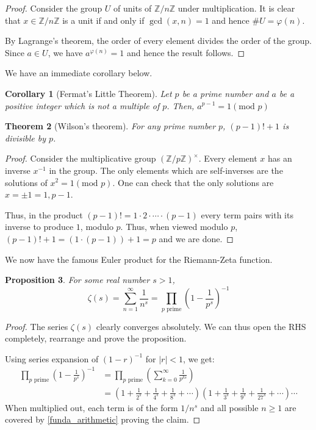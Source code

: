 \documentclass[10pt,openany]{book}
\newtheorem{theorem}{Theorem}[chapter]
\newtheorem{proposition}[theorem]{Proposition}
\theoremstyle{italicnonumber}
\newtheorem{corollary}[theorem]{Corollary}
\theoremstyle{definition}
\newcommand{\Z}{\mathbb{Z}}
\begin{document}
\begin{proof}
  Consider the group $U$ of units of $\Z/n\Z$ under multiplication. It is clear that $x \in \Z/n\Z$ is a unit if and only if $\gcd(x,n)=1$ and hence $\#U = \varphi(n)$. 
  
  By Lagrange's theorem, the order of every element divides the order of the group. Since $a \in U$, we have $a^{\varphi(n)}=1$ and hence the result follows.
\end{proof}

We have an immediate corollary below.

\begin{corollary} [Fermat's Little Theorem]
  Let $p$ be a prime number and $a$ be a positive integer which is not a multiple of $p$. Then, $a^{p-1} = 1 (\text{mod } p)$
\end{corollary}

\begin{theorem} [Wilson's theorem]
  For any prime number $p$, $(p-1)!+1$ is divisible by $p$.
\end{theorem}

\begin{proof}
  Consider the multiplicative group $\left( \Z/p\Z\right)^{\times}$. Every element $x$ has an inverse $x^{-1}$ in the group. The only elements which are self-inverses are the solutions of $x^2 = 1 (\text{mod } p)$. One can check that the only solutions are $x = \pm 1 = 1, p-1$.

  Thus, in the product $(p-1)!= 1 \cdot 2 \cdot \cdots \cdot (p-1)$ every term pairs with its inverse to produce $1$, modulo $p$. Thus, when viewed modulo $p$, $(p-1)!+1 = (1 \cdot (p-1)) + 1 = p$ and we are done. 
\end{proof}

We now have the famous Euler product for the Riemann-Zeta function.

\begin{proposition} \label{eul_prod}
  For some real number $s > 1$,
  \[
  \zeta(s) = \sum_{n=1}^\infty \frac{1}{n^s} = \prod_{p \text{ prime}} \left( 1-\frac{1}{p^s} \right)^{-1}
  \]
\end{proposition}

\begin{proof}
  The series $\zeta(s)$ clearly converges absolutely. We can thus open the RHS completely, rearrange and prove the proposition.

  Using series expansion of $\left( 1-r \right)^{-1}$ for $ |r| <1$, we get:
  \[
  \begin{aligned}
    \prod_{p \text{ prime}} \left( 1-\frac{1}{p^s} \right)^{-1} & = \prod_{p \text{ prime}} \left( \sum_{k=0}^\infty \frac{1}{p^{ks}} \right) \\
    & = \left( 1+\frac{1}{2^s} + \frac{1}{4^s} + \frac{1}{8^s} + \cdots \right) \left( 1+\frac{1}{3^s} + \frac{1}{9^s} + \frac{1}{27^s} + \cdots \right) \cdots
  \end{aligned}
  \]
  When multiplied out, each term is of the form $1/n^s$ and all possible $n \geq 1$ are covered by \cref{funda_arithmetic} proving the claim.
\end{proof}
\end{document}
